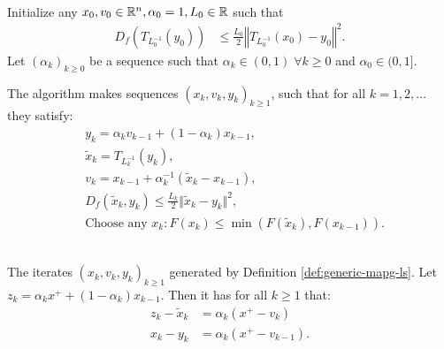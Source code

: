 \documentclass[12pt]{report}
\begin{document}
        \begin{definition}[GMAPG LS]\label{def:generic-mapg-ls}\;\\ 
            Initialize any $x_0, v_0 \in \mathbb R^n, \alpha_0 = 1, L_0 \in \mathbb R$ such that
            \begin{align*}
                D_f\left(T_{L_0^{-1}} (y_0)\right) 
                &\le \frac{L_0}{2}\left\Vert T_{L_0^{-1}}(x_0) - y_0\right\Vert^2. 
            \end{align*}
            Let $(\alpha_k)_{k \ge 0}$ be a sequence such that $\alpha_k \in (0, 1) \;\forall k \ge 0$ and $\alpha_0 \in (0, 1]$. 
            \begin{tcolorbox}
                The algorithm makes sequences $(x_k, v_k, y_k)_{k \ge 1}$, such that for all $k = 1, 2, \ldots$ they satisfy: 
                \begin{align*}
                    & y_k = \alpha_k v_{k - 1} + (1 - \alpha_k) x_{k - 1}, \\
                    & \tilde x_k = T_{L_k^{-1}}(y_{k}), \\ 
                    & v_k = x_{k - 1} + \alpha_k^{-1}(\tilde x_k - x_{k - 1}), \\
                    & D_{f}(\tilde x_k, y_k) \le \frac{L_k}{2}\Vert \tilde x_k - y_k\Vert^2, \\
                    & \text{Choose any } x_k: F(x_k) \le \min(F(\tilde x_k), F(x_{k - 1})). 
                \end{align*}    
            \end{tcolorbox}
        \end{definition}
        \begin{lemma}\;\label{lemma:apg-iterates}\;\\
            The iterates $(x_k, v_k, y_k)_{k \ge 1}$ generated by Definition \ref{def:generic-mapg-ls}. 
            Let $z_k = \alpha_k x^+ + (1 - \alpha_k)x_{k - 1}$. 
            Then it has for all $k \ge 1$ that: 
            \begin{align*}
                z_k - \tilde x_k &= \alpha_k(x^+ - v_k)
                \\
                x_k - y_k &= \alpha_k(x^+ - v_{k - 1}). 
            \end{align*}
        \end{lemma}
\end{document}
